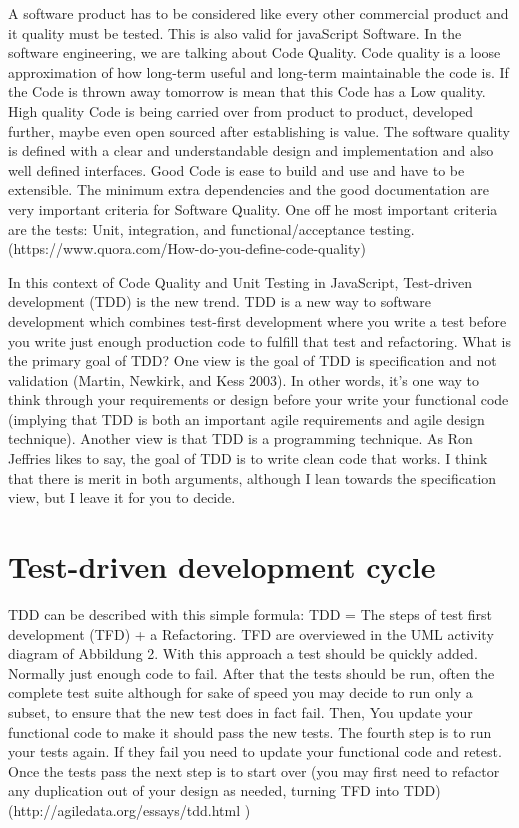 \documentclass[11pt]{article}
\begin{document}
A software product has to be considered like every other commercial product and it quality must be tested. This is also valid for javaScript Software. In the software engineering, we are talking about Code Quality. Code quality is a loose approximation of how long-term useful and long-term maintainable the code is. If the Code is thrown away tomorrow is mean that this Code has a Low quality. High quality Code is being carried over from product to product, developed further, maybe even open sourced after establishing is value. The software quality is defined with a clear and understandable design and implementation and also well defined interfaces. Good Code is ease to build and use and have to be extensible. The minimum extra dependencies and the good documentation are very important criteria for Software Quality. One off he most important criteria are the tests: Unit, integration, and functional/acceptance testing. (https://www.quora.com/How-do-you-define-code-quality)

In this context of Code Quality and Unit Testing in JavaScript, Test-driven development (TDD) is the new trend. TDD is a new way to software development which combines test-first development where you write a test before you write just enough production code to fulfill that test and refactoring. What is the primary goal of TDD? One view is the goal of TDD is specification and not validation (Martin, Newkirk, and Kess 2003). In other words, it’s one way to think through your requirements or design before your write your functional code (implying that TDD is both an important agile requirements and agile design technique). Another view is that TDD is a programming technique. As Ron Jeffries likes to say, the goal of TDD is to write clean code that works. I think that there is merit in both arguments, although I lean towards the specification view, but I leave it for you to decide. 

\section{Test-driven development cycle}

TDD can be described with this simple formula: TDD = The steps of test first development (TFD) + a Refactoring. TFD are overviewed in the UML activity diagram of Abbildung 2. With this approach a test should be quickly added. Normally just enough code to fail. After that the tests should be run, often the complete test suite although for sake of speed you may decide to run only a subset, to ensure that the new test does in fact fail. Then, You update your functional code to make it should pass the new tests. The fourth step is to run your tests again. If they fail you need to update your functional code and retest. Once the tests pass the next step is to start over (you may first need to refactor any duplication out of your design as needed, turning TFD into TDD) (http://agiledata.org/essays/tdd.html )
\end{document}
